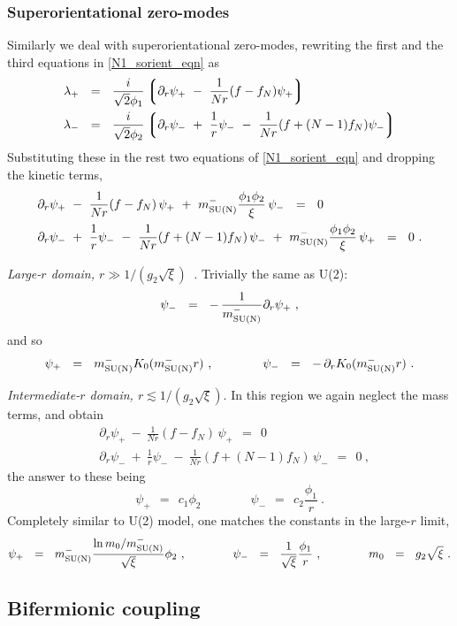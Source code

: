\documentclass{article}
\newcommand{\p}{\partial}
\newcommand{\lgr}{\left\lgroup}
\newcommand{\rgr}{\right\rgroup}
\newcommand{\mNm}{m_{\rm SU(N)}^{-}}
\begin{document}
\subsubsection{Superorientational zero-modes}

Similarly we deal with superorientational zero-modes, rewriting the first and the third equations in \eqref{N1_sorient_eqn} as
\begin{align}
%
\notag
	\lambda_+ & ~~=~~ \frac{i}{\sqrt{2}\phi_1} \lgr \p_r \psi_+ ~-~ \frac{1}{Nr}(f - f_N)\psi_+ \rgr  \\
%
\notag
	\lambda_- & ~~=~~ \frac{i}{\sqrt{2}\phi_2} \lgr \p_r \psi_- ~+~ \frac{1}{r} \psi_- ~-~ \frac{1}{Nr}(f + (N-1)f_N)\psi_- \rgr
\end{align}
Substituting these in the rest two equations of \eqref{N1_sorient_eqn} and dropping the kinetic terms, 
\begin{align*}
%
\notag
	& \p_r \psi_+ ~-~ \frac{1}{Nr} (f - f_N)\, \psi_+ ~+~ \mNm \frac{\phi_1\phi_2}{\xi}\, \psi_- ~~=~~ 0 \\
%
\notag
	& \p_r \psi_- ~+~ \frac{1}{r}\psi_- ~-~ \frac{1}{Nr}(f + (N-1)f_N)\, \psi_- ~+~ \mNm \frac{\phi_1\phi_2}{\xi}\, \psi_+ ~~=~~ 0~.
\end{align*}

{\it Large-$r$ domain, $ r \gg 1/(g_2\sqrt{\xi})$~.} 
Trivially the same as U(2):
\[
	\psi_- ~~=~~ -\,\frac{1}{\mNm} \p_r \psi_+~,
\]
and so
\[
	\psi_+ ~~=~~ \mNm K_0(\mNm r)~, \qquad\qquad \psi_- ~~=~~ -\, \p_r K_0(\mNm r)~.
\]

{\it Intermediate-$r$ domain, $ r \lesssim 1/(g_2\sqrt{\xi}) $}.
In this region we again neglect the mass terms, and obtain
\begin{align*}
%
	& \p_r \psi_+ ~-~ \frac{1}{Nr}(f - f_N)\, \psi_+ ~~=~~ 0 \\
%
	& \p_r \psi_- ~+~ \frac{1}{r}\psi_- ~-~ \frac{1}{Nr}(f + (N-1)f_N)\, \psi_- ~~=~~0~,
\end{align*}
the answer to these being
\[
	\psi_+ ~~=~~ c_1 \phi_2 \qquad\qquad	\psi_- ~~=~~ c_2 \frac{\phi_1}{r}~.
\]
Completely similar to U(2) model, one matches the constants in the large-$r$ limit,
\begin{equation}
\label{tail_sorient}
	\psi_+ ~~=~~ \mNm \frac{\ln m_0/\mNm}{\sqrt{\xi}} \phi_2~,
	\qquad\qquad
	\psi_- ~~=~~ \frac{1}{\sqrt{\xi}} \frac{\phi_1}{r}~,
	\qquad\qquad
	m_0 ~~=~~ g_2\sqrt{\xi}~.
\end{equation}

\subsection{Bifermionic coupling}
\end{document}
